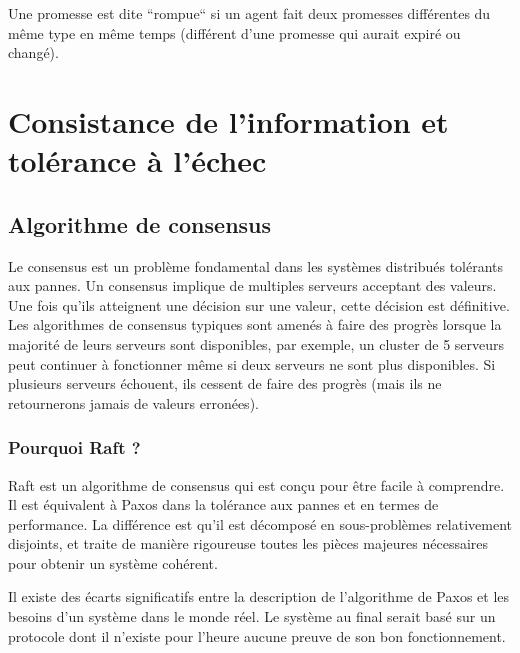 Une promesse est dite ``rompue`` si un agent fait deux promesses différentes du
même type en même temps (différent d'une promesse qui aurait expiré ou changé).

\section{Consistance de l'information et tolérance à l'échec}

\subsection{Algorithme de consensus}

Le consensus est un problème fondamental dans les systèmes distribués tolérants
aux pannes. Un consensus implique de multiples serveurs acceptant des valeurs.
Une fois qu'ils atteignent une décision sur une valeur, cette décision est
définitive. Les algorithmes de consensus typiques sont amenés à faire des
progrès lorsque la majorité de leurs serveurs sont disponibles, par exemple, un
cluster de 5 serveurs peut continuer à fonctionner même si deux serveurs ne sont
plus disponibles. Si plusieurs serveurs échouent, ils cessent de faire des
progrès (mais ils ne retournerons jamais de valeurs erronées).

\subsubsection{Pourquoi Raft ?}

Raft est un algorithme de consensus qui est conçu pour être facile à comprendre.
Il est équivalent à Paxos dans la tolérance aux pannes et en termes de
performance. La différence est qu'il est décomposé en sous-problèmes
relativement disjoints, et traite de manière rigoureuse toutes les pièces
majeures nécessaires pour obtenir un système cohérent.

Il existe des écarts significatifs entre la description de l'algorithme de Paxos
et les besoins d'un système dans le monde réel. Le système au final serait basé
sur un protocole dont il n'existe pour l'heure aucune preuve de son bon
fonctionnement. %

